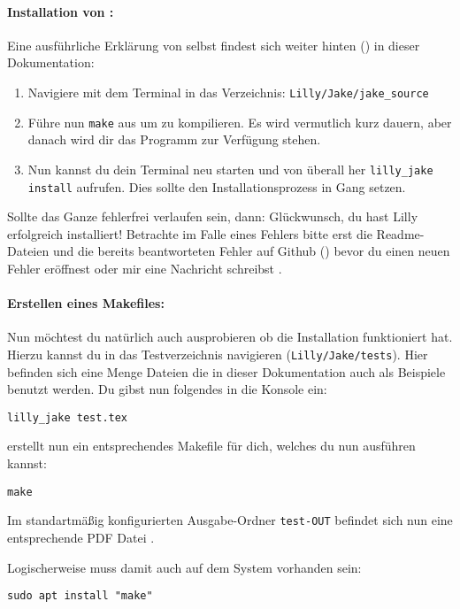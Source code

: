 \paragraph{Installation von \Jake:}Eine ausführliche Erklärung von \Jake selbst findest sich weiter hinten () in dieser Dokumentation:\smallskip
{}
\begin{enumerate}\setlength{\itemsep}{0.25\baselineskip}
    \item Navigiere mit dem Terminal in das Verzeichnis: \verb|Lilly/Jake/jake_source|
    \item Führe nun \verb|make| aus um \Jake zu kompilieren. 
          Es wird vermutlich kurz dauern, aber danach wird dir das Programm \LJake zur Verfügung stehen.
    \item Nun kannst du dein Terminal neu starten und von überall her \verb|lilly_jake install| aufrufen.
          Dies sollte den Installationsprozess in Gang setzen.\smallskip
\end{enumerate}
Sollte das Ganze fehlerfrei verlaufen sein, dann: Glückwunsch, du hast Lilly erfolgreich installiert!
Betrachte im Falle eines Fehlers bitte erst die Readme-Dateien und die bereits beantworteten Fehler
auf Github (\href{https://github.com/EagleoutIce/LILLY/issues}{\faGithub}) bevor du einen neuen Fehler
eröffnest oder mir eine Nachricht schreibst \Smiley.
\paragraph{Erstellen eines Makefiles:}
Nun möchtest du natürlich auch ausprobieren ob die Installation funktioniert hat. 
Hierzu kannst du in das Testverzeichnis navigieren (\verb|Lilly/Jake/tests|). 
Hier befinden sich eine Menge Dateien die in dieser Dokumentation auch als Beispiele benutzt werden.
Du gibst nun folgendes in die Konsole ein: 
\begin{lstlisting}[style=bash]
lilly_jake test.tex
\end{lstlisting}
\Jake erstellt nun ein entsprechendes Makefile für dich, welches du nun ausführen kannst:
\begin{lstlisting}[style=bash]
make 
\end{lstlisting}
Im standartmäßig konfigurierten Ausgabe-Ordner \verb|test-OUT| befindet sich nun eine entsprechende PDF
Datei \Smiley.\smallskip
\begin{bemerkung}[make]
    Logischerweise muss damit auch  auf dem System vorhanden sein:
\begin{lstlisting}[style=bash]
sudo apt install "make"
\end{lstlisting}
\end{bemerkung}

